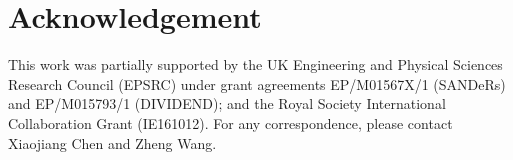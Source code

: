 \section{Acknowledgement}
This work was partially supported by the UK Engineering and Physical Sciences Research Council (EPSRC) under grant agreements EP/M01567X/1
(SANDeRs) and EP/M015793/1 (DIVIDEND); and the Royal Society International Collaboration Grant (IE161012). For any correspondence, please
contact Xiaojiang Chen and Zheng Wang. 
